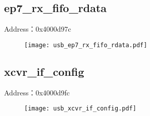 \subsection{ep7\_rx\_fifo\_rdata}
\label{usb-ep7-rx-fifo-rdata}
Address：0x4000d97c
 \begin{figure}[H]
\texttt{[image: usb\_ep7\_rx\_fifo\_rdata.pdf]}
\end{figure}

\subsection{xcvr\_if\_config}
\label{usb-xcvr-if-config}
Address：0x4000d9fc
 \begin{figure}[H]
\texttt{[image: usb\_xcvr\_if\_config.pdf]}
\end{figure}

